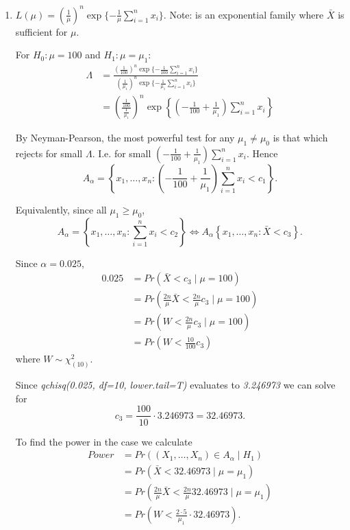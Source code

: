\documentclass[12pt]{article}
\begin{document}
\begin{enumerate}[leftmargin=\labelsep]
\item 

$L(\mu) = \left(\frac{1}{\mu}\right)^n \exp\{ - \frac{1}{\mu}\sum_{i=1}^{n}x_i\}$. Note: is an exponential family where $\bar{X}$ is sufficient for $\mu$.  

For $H_0: \mu = 100$ and $H_1: \mu = \mu_1$:
\begin{align*}
\Lambda &= \frac{\left(\frac{1}{100}\right)^n \exp\{ - \frac{1}{100}\sum_{i=1}^{n}x_i\}}{\left(\frac{1}{\mu_1}\right)^n \exp\{ - \frac{1}{\mu_1}\sum_{i=1}^{n}x_i\}} \\
&= \left(\frac{\frac{1}{100}}{\frac{1}{\mu_1}}\right)^n \exp\left\{\left(-\frac{1}{100} + \frac{1}{\mu_1} \right) \sum_{i=1}^{n}x_i \right\}
\end{align*}

By Neyman-Pearson, the most powerful test for any $\mu_1 \neq \mu_0$ is that which rejects for small $\Lambda$. I.e. for small $\left(-\frac{1}{100} + \frac{1}{\mu_1} \right) \sum_{i=1}^{n}x_i$. Hence $$A_{\alpha} = \left\{x_1, \dots, x_n :  \left(-\frac{1}{100} + \frac{1}{\mu_1} \right) \sum_{i=1}^{n}x_i < c_1 \right\}.$$

Equivalently, since all $\mu_1 \geq \mu_0$,  $$A_{\alpha} = \left\{x_1, \dots, x_n : \sum_{i=1}^{n}x_i < c_2\right\} \Longleftrightarrow  A_{\alpha} \left\{x_1, \dots, x_n : \bar{X} < c_3\right\}. $$


Since $\alpha = 0.025$, 
\begin{align*}
0.025 &= Pr\left(\bar{X} < c_3 \mid \mu = 100 \right) \\
&= Pr\left( \frac{2n}{\mu}\bar{X} < \frac{2n}{\mu} c_3 \mid \mu = 100\right)  \\
&= Pr\left( W< \frac{2n}{\mu} c_3 \mid \mu = 100\right)  \\
&= Pr\left(W < \frac{10}{100}c_3 \right)  
\end{align*}
where $W \sim \chi_{(10)}^2$. 

Since \textit{qchisq(0.025, df=10, lower.tail=T)} evaluates to \textit{3.246973} we can solve for 
$$c_3 = \frac{100}{10}\cdot 3.246973 = 32.46973.$$

To find the power in the case we calculate 
\begin{align*}
Power &= Pr\left((X_1, \dots, X_n) \in A_{\alpha} \mid H_1 \right)\\
&= Pr\left(\bar{X} < 32.46973 \mid \mu = \mu_1 \right)   \\
&= Pr\left(\frac{2n}{\mu}\bar{X} < \frac{2n}{\mu}32.46973 \mid \mu = \mu_1  \right) \\
&= Pr\left(W < \frac{2\cdot 5}{\mu_1} \cdot 32.46973 \right). 
\end{align*}





\end{enumerate}
\end{document}
